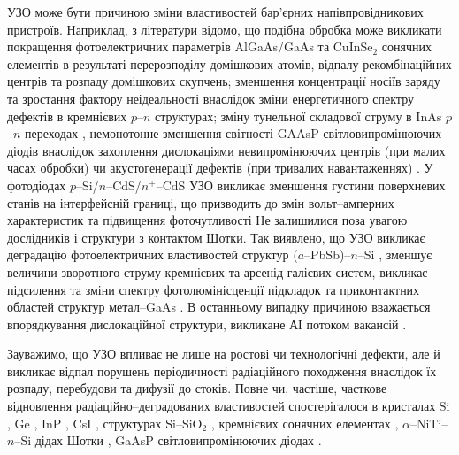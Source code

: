 УЗО може бути причиною зміни властивостей бар'єрних напівпровідникових пристроїв.
Наприклад, з літератури відомо, що подібна обробка може викликати покращення фотоелектричних параметрів AlGaAs/GaAs \cite{Zaver2005} та CuInSe$_2$ \cite{OstapSC} сонячних елементів в результаті перерозподілу домішкових атомів, відпалу рекомбінаційних центрів та розпаду домішкових скупчень;
зменшення концентрації носіїв заряду \cite{Davletova2008}
та зростання фактору неідеальності \cite{Davletova2009}
внаслідок зміни енергетичного спектру дефектів в кремнієвих $p$--$n$ структурах;
зміну тунельної складової струму в InAs $p$--$n$ переходах \cite{Teterkin2009r},
немонотонне зменшення світності GAAsP світловипромінюючих діодів внаслідок захоплення дислокаціями невипромінюючих центрів (при малих часах обробки) чи акустогенерації дефектів (при тривалих навантаженнях) \cite{US:LED}.
У фотодіодах $p$--Si/$n$--CdS/$n^+$--CdS УЗО викликає зменшення густини поверхневих станів на інтерфейсній границі,
що призводить до змін вольт--амперних характеристик та підвищення фоточутливості \cite{Mirsagatov,Mirsagatov2}
Не залишилися поза увагою дослідників і структури з контактом Шотки.
Так виявлено, що УЗО викликає деградацію фотоелектричних властивостей структур ($a$--PbSb)--$n$--Si \cite{Pashaev2012r,PashOJA},
зменшує величини зворотного струму кремнієвих \cite{Tagaev} та арсенід галієвих \cite{UST:SDErmol} систем,
викликає підсилення та зміни спектру фотолюмінісценції підкладок та приконтактних областей структур метал--GaAs \cite{UST:SDErmol}.
В останньому випадку причиною вважається впорядкування дислокаційної структури, викликане АІ потоком вакансій \cite{UST:SDErmol}.

Зауважимо, що УЗО впливає не лише на ростові чи технологічні дефекти, але й викликає відпал порушень періодичності радіаційного походження внаслідок їх розпаду, перебудови та дифузії до стоків.
Повне чи, частіше, часткове відновлення радіаційно--деградованих властивостей спостерігалося
в кристалах Si  \cite{OstrovRadSi,Podolian2012r,PodolHivr,YOlikh2006TPLr}, Ge \cite{Olikh:FTP1996},
InP \cite{OlikhProc}, CsI \cite{UST:OstrovCsI}, структурах Si--SiO$_2$ \cite{Parchinskii2000r,Parchinskii2006r},
кремнієвих сонячних елементах \cite{YOlikh2007TPLr},
$\alpha$--NiTi--$n$--Si дідах Шотки \cite{Pashaev2014r},
GaAsP світловипромінюючих діодах \cite{US:LED,UST:LED_SM}.



